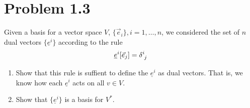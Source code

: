 \documentclass[12pt,a4paper]{article}
\newcommand{\und}[1]{\underline{#1}}
\begin{document}
	\section*{
		Problem 1.3
	}
	\begin{problem}
		Given a basis for a vector space $V$, $\{\vec{e}_i\}, i = 1,\ldots,n$, we considered
		the set of $n$ dual vectors $\{\underline{e}^i\}$ according to the rule
		\begin{equation}
			\label{eq:1.3.1}
			\underline{e}^i[\vec{e}_j] = \tensor{\delta}{^i_j}
		\end{equation}
		\begin{enumerate}[(1)]
			\item Show that this rule is suffient to define the $\underline{e}^i$  as dual
				vectors. That is, we know how each $\underline{e}^i$ acts on all $v\in V$.
			\item Show that $\{\und{e}^i\}$ is a basis for $V^*$.
		\end{enumerate}
	\end{problem}
\end{document}
